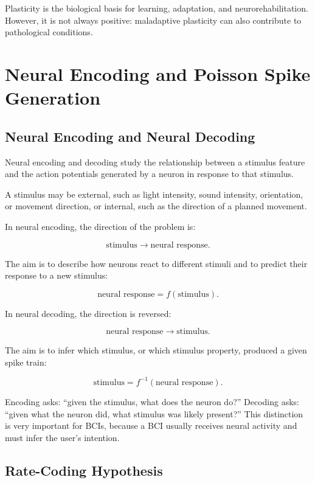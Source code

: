 \begin{authornote}
Plasticity is the biological basis for learning, adaptation, and neurorehabilitation. However, it is not always positive: maladaptive plasticity can also contribute to pathological conditions.
\end{authornote}

\section{Neural Encoding and Poisson Spike Generation}

\subsection{Neural Encoding and Neural Decoding}

Neural encoding and decoding study the relationship between a stimulus feature and the action potentials generated by a neuron in response to that stimulus.

A stimulus may be external, such as light intensity, sound intensity, orientation, or movement direction, or internal, such as the direction of a planned movement.

In neural encoding, the direction of the problem is:

\[
\text{stimulus} \longrightarrow \text{neural response}.
\]

The aim is to describe how neurons react to different stimuli and to predict their response to a new stimulus:

\[
\text{neural response} = f(\text{stimulus}).
\]

In neural decoding, the direction is reversed:

\[
\text{neural response} \longrightarrow \text{stimulus}.
\]

The aim is to infer which stimulus, or which stimulus property, produced a given spike train:

\[
\text{stimulus} = f^{-1}(\text{neural response}).
\]

\begin{authornote}
Encoding asks: ``given the stimulus, what does the neuron do?'' Decoding asks: ``given what the neuron did, what stimulus was likely present?'' This distinction is very important for BCIs, because a BCI usually receives neural activity and must infer the user's intention.
\end{authornote}

\subsection{Rate-Coding Hypothesis}

